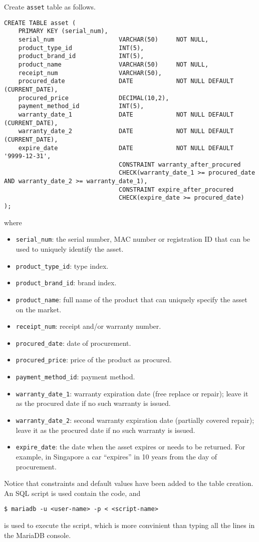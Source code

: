 Create \verb|asset| table as follows.
\begin{lstlisting}
CREATE TABLE asset (
    PRIMARY KEY (serial_num),
    serial_num                  VARCHAR(50)     NOT NULL,
    product_type_id             INT(5),
    product_brand_id            INT(5),
    product_name                VARCHAR(50)     NOT NULL,
    receipt_num                 VARCHAR(50),
    procured_date               DATE            NOT NULL DEFAULT (CURRENT_DATE),
    procured_price              DECIMAL(10,2),
    payment_method_id           INT(5),
    warranty_date_1             DATE            NOT NULL DEFAULT (CURRENT_DATE),
    warranty_date_2             DATE            NOT NULL DEFAULT (CURRENT_DATE),
    expire_date                 DATE            NOT NULL DEFAULT '9999-12-31',
                                CONSTRAINT warranty_after_procured
                                CHECK(warranty_date_1 >= procured_date AND warranty_date_2 >= warranty_date_1),
                                CONSTRAINT expire_after_procured
                                CHECK(expire_date >= procured_date)
);
\end{lstlisting}
where
\begin{itemize}
  \item \verb|serial_num|: the serial number, MAC number or registration ID that can be used to uniquely identify the asset.
  \item \verb|product_type_id|: type index.
  \item \verb|product_brand_id|: brand index.
  \item \verb|product_name|: full name of the product that can uniquely specify the asset on the market.
  \item \verb|receipt_num|: receipt and/or warranty number.
  \item \verb|procured_date|: date of procurement.
  \item \verb|procured_price|: price of the product as procured.
  \item \verb|payment_method_id|: payment method.
  \item \verb|warranty_date_1|: warranty expiration date (free replace or repair); leave it as the procured date if no such warranty is issued.
  \item \verb|warranty_date_2|: second warranty expiration date (partially covered repair); leave it as the procured date if no such warranty is issued.
  \item \verb|expire_date|: the date when the asset expires or needs to be returned. For example, in Singapore a car ``expires'' in 10 years from the day of procurement.
\end{itemize}
Notice that constraints and default values have been added to the table creation. An SQL script is used contain the code, and
\begin{lstlisting}
$ mariadb -u <user-name> -p < <script-name>
\end{lstlisting}
is used to execute the script, which is more convinient than typing all the lines in the MariaDB console.


